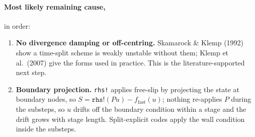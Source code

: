 \documentclass[11pt,a4paper]{article}
\begin{document}
\paragraph{Most likely remaining cause,} in order:
\begin{enumerate}
\item \textbf{No divergence damping or off-centring.} Skamarock \& Klemp (1992)
  show a time-split scheme is weakly unstable without them; Klemp et al.\ (2007)
  give the forms used in practice. This is the literature-supported next step.
\item \textbf{Boundary projection.} \texttt{rhs!} applies free-slip by
  projecting the state at boundary nodes, so $S = \texttt{rhs!}(Pu) -
  f_{\mathrm{fast}}(u)$; nothing re-applies $P$ during the substeps, so $u$
  drifts off the boundary condition within a stage and the drift grows with
  stage length. Split-explicit codes apply the wall condition inside the
  substeps.
\end{enumerate}
\end{document}
